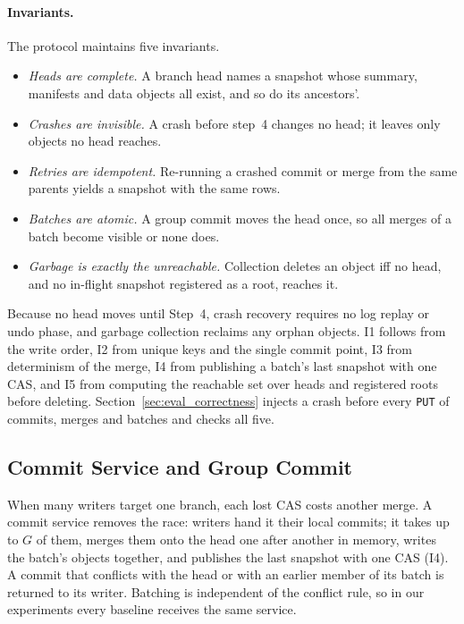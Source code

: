 \documentclass[sigconf, nonacm]{acmart}
\begin{document}
\paragraph{Invariants.} The protocol maintains five invariants.
\begin{itemize}[leftmargin=14pt, itemsep=0pt, topsep=1pt]
    \item[\textbf{I1}] \emph{Heads are complete.} A branch head names a snapshot whose summary, manifests and data objects all exist, and so do its ancestors'.
    \item[\textbf{I2}] \emph{Crashes are invisible.} A crash before step~4 changes no head; it leaves only objects no head reaches.
    \item[\textbf{I3}] \emph{Retries are idempotent.} Re-running a crashed commit or merge from the same parents yields a snapshot with the same rows.
    \item[\textbf{I4}] \emph{Batches are atomic.} A group commit moves the head once, so all merges of a batch become visible or none does.
    \item[\textbf{I5}] \emph{Garbage is exactly the unreachable.} Collection deletes an object iff no head, and no in-flight snapshot registered as a root, reaches it.
\end{itemize}
Because no head moves until Step~4, crash recovery requires no log replay or undo phase, and garbage collection reclaims any orphan objects. I1 follows from the write order, I2 from unique keys and the single commit point, I3 from determinism of the merge, I4 from publishing a batch's last snapshot with one CAS, and I5 from computing the reachable set over heads and registered roots before deleting. Section~\ref{sec:eval_correctness} injects a crash before every \texttt{PUT} of commits, merges and batches and checks all five.

\subsection{Commit Service and Group Commit}
\label{sec:design_swarm}

When many writers target one branch, each lost CAS costs another merge. A commit service removes the race: writers hand it their local commits; it takes up to $G$ of them, merges them onto the head one after another in memory, writes the batch's objects together, and publishes the last snapshot with one CAS (I4). A commit that conflicts with the head or with an earlier member of its batch is returned to its writer. Batching is independent of the conflict rule, so in our experiments every baseline receives the same service.
\end{document}
